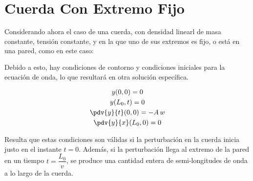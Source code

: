 \section{Cuerda Con Extremo Fijo}

Considerando ahora el caso de una cuerda, con densidad linearl de masa
constante, tensión constante, y en la que uno de sus extremos es fijo,
o está en una pared, como en este caso:

\begin{center}
\end{center}

Debido a esto, hay condiciones de contorno y condiciones iniciales para
la ecuación de onda, lo que resultará en otra solución específica.

\begin{gather*}
    y(0,0) = 0\\
    y(L_0,t) = 0\\
    \pdv{y}{t}(0,0) = -A\,w\\
    \pdv{y}{x}(L_0,0) = 0
\end{gather*}

Resulta que estas condiciones son válidas si la perturbación en la
cuerda inicia justo en el instante $t=0$. Además, si la perturbación
llega al extremo de la pared en un tiempo $t = \dfrac{L_0}{v}$, se
produce una cantidad entera de semi-longitudes de onda a lo largo de
la cuerda.
